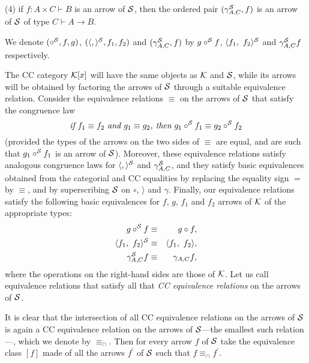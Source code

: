 \documentclass[12pt]{article}
\begin{document}
\noindent (4) if $f:A\times C\vdash B$ is an arrow of ${\cal S}$, then the
ordered pair $(\gamma _{A,C}^{{\cal S}},f)$ is an arrow of ${\cal S}$ of
type $C\vdash A\rightarrow B$.\medskip

\noindent We denote $(\circ ^{{\cal S}},f,g)$, $(\langle ,\rangle ^{{\cal S}%
},f_{1},f_{2})$ and $(\gamma _{A,C}^{{\cal S}},f)$ by $g\circ ^{{\cal S}}f$, 
$\langle f_{1},~f_{2}\rangle ^{{\cal S}}$ and $\gamma _{A,C}^{{\cal S}}f$
respectively.

The CC category ${\cal K}[x]$ will have the same objects as ${\cal K}$ and $%
{\cal S}$, while its arrows will be obtained by factoring the arrows of $%
{\cal S}$ through a suitable equivalence relation. Consider the equivalence
relations $\equiv $ on the arrows of ${\cal S}$ that satisfy the congruence
law 
\[
\text{{\it if} }f_{1}\equiv f_{2}\text{{\it \ and }}g_{1}\equiv g_{2}\text{%
{\it , then} }g_{1}\circ ^{{\cal S}}f_{1}\equiv g_{2}\circ ^{{\cal S}}f_{2} 
\]
(provided the types of the arrows on the two sides of $\equiv $ are equal,
and are such that $g_{1}\circ ^{{\cal S}}f_{1}$ is an arrow of ${\cal S}$).
Moreover, these equivalence relations satisfy analogous congruence laws for $%
\langle ,\rangle ^{{\cal S}}$ and $\gamma _{A,C}^{{\cal S}}$, and they
satisfy basic equivalences obtained from the categorial and CC equalities by
replacing the equality sign $=$ by $\equiv $, and by superscribing ${\cal S}$
on $\circ $, $\rangle $ and $\gamma $. Finally, our equivalence relations
satisfy the following basic equivalences for $f$, $g$, $f_{1}$ and $f_{2}$
arrows of ${\cal K}$ of the appropriate types: 
\begin{eqnarray*}
g\circ ^{{\cal S}}f &\equiv &g\circ f, \\
\langle f_{1},~f_{2}\rangle ^{{\cal S}} &\equiv &\langle f_{1},~f_{2}\rangle
, \\
\gamma _{A,C}^{{\cal S}}f &\equiv &\gamma _{A,C}f,
\end{eqnarray*}
where the operations on the right-hand sides are those of ${\cal K}$. Let us
call equivalence relations that satisfy all that {\it CC equivalence
relations} on the arrows of ${\cal S}$.

It is clear that the intersection of all CC equivalence relations on the
arrows of ${\cal S}$ is again a CC equivalence relation on the arrows of $%
{\cal S}$---the smallest such relation---, which we denote by $\equiv _{\cap
}$. Then for every arrow $f$ of ${\cal S}$ take the equivalence class $[f]$
made of all the arrows $f^{\prime }$ of ${\cal S}$ such that $f\equiv _{\cap
}f^{\prime }$.
\end{document}
